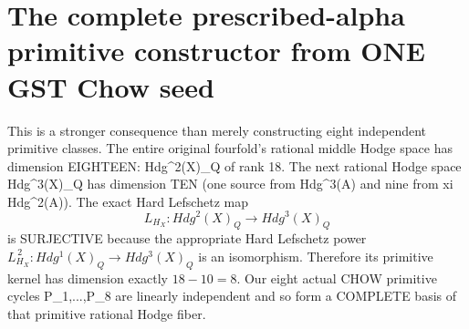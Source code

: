 \documentclass[11pt]{article}
\begin{document}
\section{The complete prescribed-alpha primitive constructor from ONE GST Chow seed}
This is a stronger consequence than merely
constructing eight independent primitive classes.
The entire original fourfold's rational middle
Hodge space has dimension EIGHTEEN:
Hdg^2(X)_Q of rank 18. The next
rational Hodge space Hdg^3(X)_Q
has dimension TEN (one source from
Hdg^3(A) and nine from xi Hdg^2(A)).
The exact Hard Lefschetz map
\[
L_{H_X}:Hdg^2(X)_Q\longrightarrow
Hdg^3(X)_Q
\]
is SURJECTIVE because the appropriate
Hard Lefschetz power
\(L_{H_X}^{\,2}:Hdg^1(X)_Q\to
Hdg^3(X)_Q\) is an isomorphism.
Therefore its primitive kernel has
dimension exactly \(18-10=8\).
Our eight actual CHOW primitive cycles
P_1,...,P_8 are linearly independent
and so form a COMPLETE basis of that
primitive rational Hodge fiber.
\end{document}
